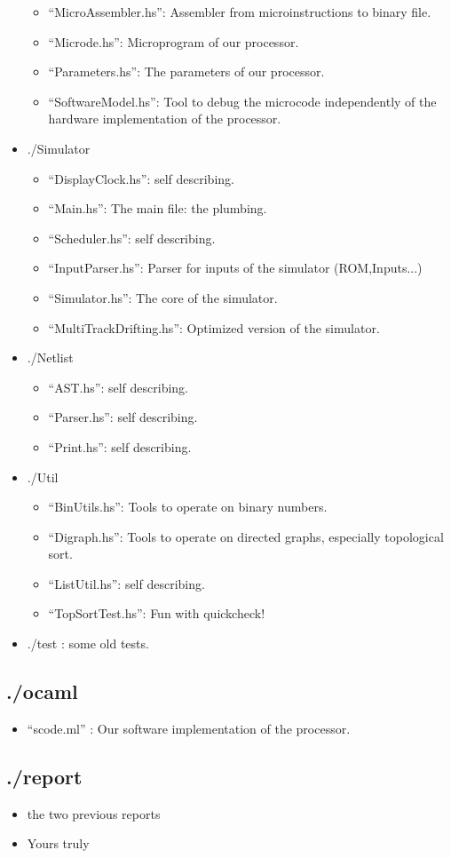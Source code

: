 \documentclass[a4paper, 11pt]{article}
\begin{document}
\begin{itemize}
\begin{itemize}
\item \enquote{MicroAssembler.hs}: Assembler from microinstructions to binary file.
\item \enquote{Microde.hs}: Microprogram of our processor.
\item \enquote{Parameters.hs}: The parameters of our processor.
\item \enquote{SoftwareModel.hs}: Tool to debug the microcode independently of the
hardware implementation of the processor.  
\end{itemize}
\item ./Simulator
\begin{itemize}
\item \enquote{DisplayClock.hs}: self describing.
\item \enquote{Main.hs}: The main file: the plumbing.
\item \enquote{Scheduler.hs}: self describing.
\item \enquote{InputParser.hs}: Parser for inputs of the simulator (ROM,Inputs...)
\item \enquote{Simulator.hs}: The core of the simulator.
\item \enquote{MultiTrackDrifting.hs}: Optimized version of the simulator.
\end{itemize}
\item ./Netlist 
\begin{itemize}
\item \enquote{AST.hs}: self describing.
\item \enquote{Parser.hs}: self describing.
\item \enquote{Print.hs}: self describing.
\end{itemize}
\item ./Util
\begin{itemize}
\item \enquote{BinUtils.hs}: Tools to operate on binary numbers.
\item \enquote{Digraph.hs}: Tools to operate on directed graphs, especially topological sort.
\item \enquote{ListUtil.hs}: self describing.
\item \enquote{TopSortTest.hs}: Fun with quickcheck!
\end{itemize}
\item ./test : some old tests.
\end{itemize}

\subsection{./ocaml}
\begin{itemize}
\item \enquote{scode.ml} : Our software implementation of the processor. 
\end{itemize}
\subsection{./report}
\begin{itemize}
\item the two previous reports
\item Yours truly
\end{itemize}




\end{document}
